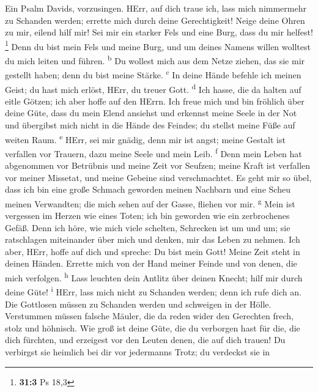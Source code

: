  Ein Psalm Davids, vorzusingen.  HErr, auf
dich traue ich, lass mich nimmermehr zu Schanden werden; errette mich
durch deine Gerechtigkeit!  Neige deine Ohren zu mir,
eilend hilf mir! Sei mir ein starker Fels und eine Burg, dass du mir
helfest! \footnote{\textbf{31:3} Ps 18,3}  Denn du bist
mein Fels und meine Burg, und um deines Namens willen wolltest du mich
leiten und führen. \textsuperscript{b}  Du wollest mich
aus dem Netze ziehen, das sie mir gestellt haben; denn du bist meine
Stärke. \textsuperscript{c}  In deine Hände befehle ich
meinen Geist; du hast mich erlöst, HErr, du treuer Gott.
\textsuperscript{d}  Ich hasse, die da halten auf eitle
Götzen; ich aber hoffe auf den HErrn.  Ich freue mich und
bin fröhlich über deine Güte, dass du mein Elend ansiehst und erkennst
meine Seele in der Not  und übergibst mich nicht in die
Hände des Feindes; du stellst meine Füße auf weiten Raum.
\textsuperscript{e}  HErr, sei mir gnädig, denn mir ist
angst; meine Gestalt ist verfallen vor Trauern, dazu meine Seele und
mein Leib. \textsuperscript{f}  Denn mein Leben hat
abgenommen vor Betrübnis und meine Zeit vor Seufzen; meine Kraft ist
verfallen vor meiner Missetat, und meine Gebeine sind verschmachtet.
 Es geht mir so übel, dass ich bin eine große Schmach
geworden meinen Nachbarn und eine Scheu meinen Verwandten; die mich
sehen auf der Gasse, fliehen vor mir. \textsuperscript{g}
 Mein ist vergessen im Herzen wie eines Toten; ich bin
geworden wie ein zerbrochenes Gefäß.  Denn ich höre, wie
mich viele schelten, Schrecken ist um und um; sie ratschlagen
miteinander über mich und denken, mir das Leben zu nehmen.
 Ich aber, HErr, hoffe auf dich und spreche: Du bist mein
Gott!  Meine Zeit steht in deinen Händen. Errette mich
von der Hand meiner Feinde und von denen, die mich verfolgen.
\textsuperscript{h}  Lass leuchten dein Antlitz über
deinen Knecht; hilf mir durch deine Güte! \textsuperscript{i}
 HErr, lass mich nicht zu Schanden werden; denn ich rufe
dich an. Die Gottlosen müssen zu Schanden werden und schweigen in der
Hölle.  Verstummen müssen falsche Mäuler, die da reden
wider den Gerechten frech, stolz und höhnisch.  Wie groß
ist deine Güte, die du verborgen hast für die, die dich fürchten, und
erzeigest vor den Leuten denen, die auf dich trauen!  Du
verbirgst sie heimlich bei dir vor jedermanns Trotz; du verdeckst sie in

